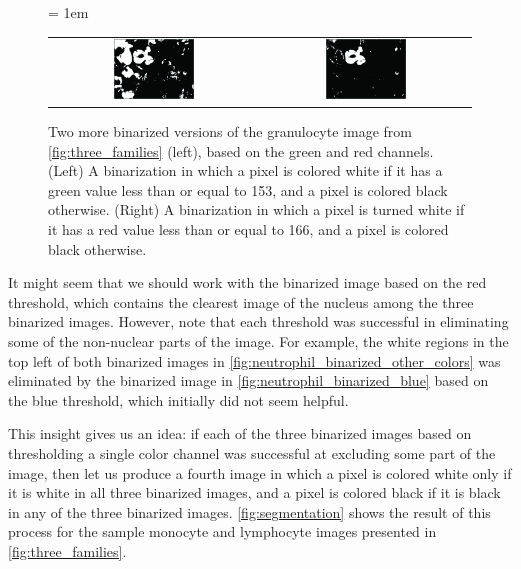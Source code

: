 \begin{figure}[h]
\centering
 \tabcolsep = 1em
\mySfFamily
\begin{tabular}{c c}
\includegraphics[width = 0.4\textwidth]{../images_CMYK/neutrophil_binarized_green} & \includegraphics[width = 0.4\textwidth]{../images_CMYK/neutrophil_binarized_red}
\end{tabular}
\caption{Two more binarized versions of the granulocyte image from \autoref{fig:three_families} (left), based on the green and red channels.  (Left) A binarization in which a pixel is colored white if it has a green value less than or equal to 153, and a pixel is colored black otherwise. (Right) A binarization in which a pixel is turned white if it has a red value less than or equal to 166, and a pixel is colored black otherwise.}
\label{fig:neutrophil_binarized_other_colors}
\end{figure}

It might seem that we should work with the binarized image based on the red threshold, which contains the clearest image of the nucleus among the three binarized images. However, note that each threshold was successful in eliminating some of the non-nuclear parts of the image. For example, the white regions in the top left of both binarized images in \autoref{fig:neutrophil_binarized_other_colors} was eliminated by the binarized image in \autoref{fig:neutrophil_binarized_blue} based on the blue threshold, which initially did not seem helpful.

This insight gives us an idea: if each of the three binarized images based on thresholding a single color channel was successful at excluding some part of the image, then let us produce a fourth image in which a pixel is colored white only if it is white in all three binarized images, and a pixel is colored black if it is black in any of the three binarized images. \autoref{fig:segmentation} shows the result of this process for the sample monocyte and lymphocyte images presented in \autoref{fig:three_families}. \\


